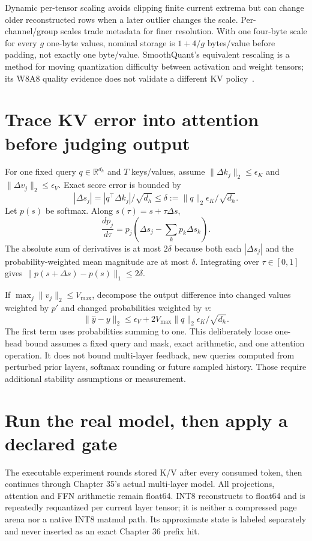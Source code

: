Dynamic per-tensor scaling avoids clipping finite current extrema but can
change older reconstructed rows when a later outlier changes the scale.
Per-channel/group scales trade metadata for finer resolution. With one
four-byte scale for every $g$ one-byte values, nominal storage is
$1+4/g$ bytes/value before padding, not exactly one byte/value.
SmoothQuant's equivalent rescaling is a method for moving quantization
difficulty between activation and weight tensors; its W8A8 quality evidence
does not validate a different KV policy~\cite{evod37:smoothquant}.

\section{Trace KV error into attention before judging output}
\label{evod37:error}
For one fixed query $q\in\mathbb R^{d_h}$ and $T$ keys/values, assume
$\|\Delta k_j\|_2\le\epsilon_K$ and
$\|\Delta v_j\|_2\le\epsilon_V$. Exact score error is bounded by
\[
 |\Delta s_j|=|q^\top\Delta k_j|/\sqrt{d_h}
 \le\delta:=\|q\|_2\epsilon_K/\sqrt{d_h}.
\]
Let $p(s)$ be softmax. Along $s(\tau)=s+\tau\Delta s$,
\[
 \frac{dp_j}{d\tau}=p_j\left(\Delta s_j-
                 \sum_k p_k\Delta s_k\right).
\]
The absolute sum of derivatives is at most $2\delta$ because both each
$|\Delta s_j|$ and the probability-weighted mean magnitude are at most
$\delta$. Integrating over $\tau\in[0,1]$ gives
$\|p(s+\Delta s)-p(s)\|_1\le2\delta$.

If $\max_j\|v_j\|_2\le V_{\max}$, decompose the output difference into
changed values weighted by $p'$ and changed probabilities weighted by $v$:
\begin{equation}
 \|\widehat y-y\|_2
 \le\epsilon_V+2V_{\max}\|q\|_2\epsilon_K/\sqrt{d_h}.
 \label{evod37:attentionbound}
\end{equation}
The first term uses probabilities summing to one. This deliberately loose
one-head bound assumes a fixed query and mask, exact arithmetic, and one
attention operation. It does not bound multi-layer feedback, new queries
computed from perturbed prior layers, softmax rounding or future sampled
history. Those require additional stability assumptions or measurement.

\section{Run the real model, then apply a declared gate}
\label{evod37:gate}
The executable experiment rounds stored K/V after every consumed token,
then continues through Chapter 35's actual multi-layer model. All projections,
attention and FFN arithmetic remain float64. INT8 reconstructs to float64
and is repeatedly requantized per current layer tensor; it is neither a
compressed page arena nor a native INT8 matmul path. Its approximate state
is labeled separately and never inserted as an exact Chapter 36 prefix hit.

